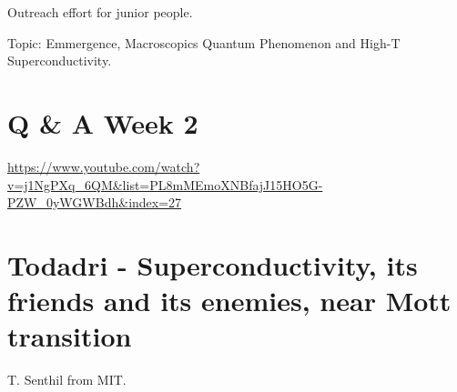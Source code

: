 \documentclass{article}
\begin{document}
Outreach effort for junior people. 

Topic: Emmergence, Macroscopics Quantum Phenomenon and High-T Superconductivity.

\section{Q \& A Week 2}
\label{sec:QA Week 2}
\url{https://www.youtube.com/watch?v=j1NgPXq_6QM&list=PL8mMEmoXNBfajJ15HO5G-PZW_0yWGWBdh&index=27}

\section{Todadri - Superconductivity, its friends and its enemies,
near Mott transition}
\label{sec:Todadri}

T. Senthil from MIT.



\end{document}
